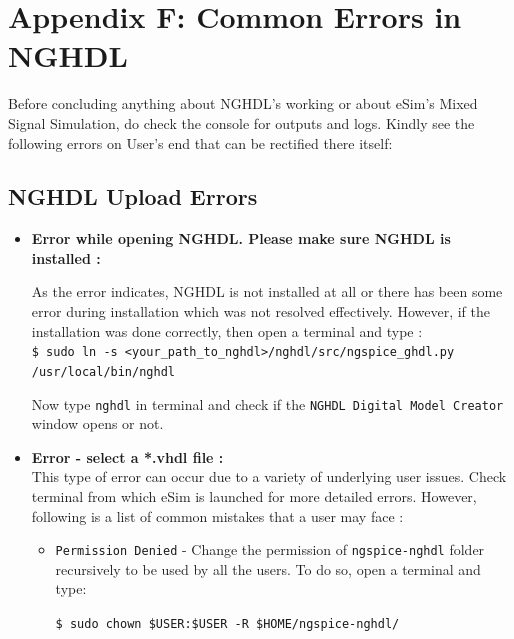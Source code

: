 \pagebreak 

\section {Appendix F: Common Errors in NGHDL}

Before concluding anything about NGHDL’s working or about eSim’s Mixed Signal Simulation, do check the console for outputs and logs. Kindly see the following errors on User’s end that can be rectified there itself:

\subsection{NGHDL Upload Errors}

\begin{itemize}
    \item \textbf{Error while opening NGHDL. Please make sure NGHDL is installed :}


As the error indicates, NGHDL is not installed at all or there has been some error during installation which was not resolved effectively. However, if the installation was done correctly, then open a terminal and type : \\

\noindent \texttt{\$ sudo ln -s <your\_path\_to\_nghdl>/nghdl/src/ngspice\_ghdl.py /usr/loc\linebreak     al/bin/nghdl}


Now type  \texttt{nghdl} in terminal and check if the \texttt{NGHDL Digital Model Creator} window opens or not.

\item \textbf{Error - select a *.vhdl file :} \\
This type of error can occur due to a variety of underlying user issues. Check terminal from which eSim is launched for more detailed errors. However, following is a list of common mistakes that a user may face : 
\begin{itemize}
    \item \texttt{Permission Denied} - Change the permission of \texttt{ngspice-nghdl} folder 
recursively to be used by all the users. To do so, open a terminal and type:
\begin{center}
    \texttt{\$ sudo chown \$USER:\$USER -R \$HOME/ngspice-nghdl/}
\end{center} 

\end{itemize}


\end{itemize}
